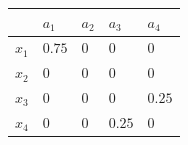 \documentclass[runningheads,a4paper]{llncs}
\begin{document}
\begin{example}
\begin{figure}
	\begin{minipage}{\textwidth}
		\begin{minipage}{0.35\textwidth}
			\centering
			\begin{tabular}{w{c}{20pt} || w{c}{20pt} | w{c}{20pt} || w{c}{20pt} | w{c}{20pt}}
				& $a_1$ & $a_2$ & $a_3$ & $a_4$ \\\hline\hline
				$x_1$ & $0.75$ & $0$ & $0$ & $0$ \\\hline
				$x_2$ & $0$ & $0$ & $0$ & $0$ \\\hline\hline
				$x_3$ & $0$ & $0$ & $0$ & $0.25$ \\\hline
				$x_4$ & $0$ & $0$ & $0.25$ & $0$
			\end{tabular}
		\end{minipage}
		\hspace{1cm}
		\begin{minipage}{0.1\textwidth}
			\centering

\end{minipage}
\end{minipage}
\end{figure}
\end{example}
\end{document}
